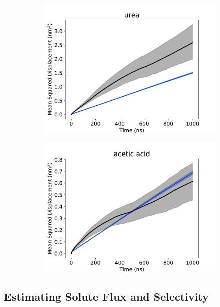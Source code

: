 \documentclass{article}
\begin{document}
\begin{figure}
\begin{subfigure}{0.45\textwidth}
  \includegraphics[width=\textwidth]{msd_URE.pdf}
  \caption{}\label{fig:msd_URE}
  \end{subfigure}
  \begin{subfigure}{0.45\textwidth}
  \includegraphics[width=\textwidth]{msd_ACH.pdf}
  \caption{}\label{fig:msd_ACH}
  \end{subfigure}
  \end{figure}
  
  
  \subsection{Estimating Solute Flux and Selectivity}  
  
\end{document}
